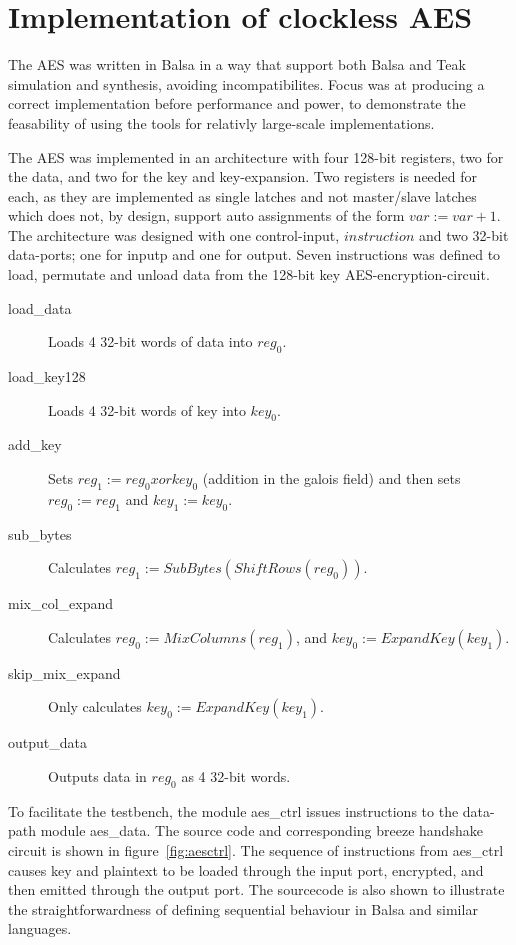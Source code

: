 \section{Implementation of clockless AES}

The AES was written in Balsa in a way that support both Balsa and
Teak simulation and synthesis, avoiding incompatibilites. Focus was at
producing a correct implementation before performance and power, to
demonstrate the feasability of using the tools for relativly
large-scale implementations.

The AES was implemented in an architecture with four 128-bit
registers, two for the data, and two for the key and
key-expansion. Two registers is needed for each, as they are
implemented as single latches and not master/slave latches which does
not, by design, support auto assignments of the form 
$var := var + 1$. The architecture was designed with one control-input,
$instruction$ and two 32-bit data-ports; one for inputp and one for
output. Seven instructions was defined to load, permutate and unload
data from the 128-bit key AES-encryption-circuit.

\begin{description}
  \item[load\_data] Loads 4 32-bit words of data into $reg_0$.
  \item[load\_key128] Loads 4 32-bit words of key into $key_0$.
  \item[add\_key] Sets $reg_1 := reg_0 xor key_0$ (addition in the
    galois field) and then sets $reg_0 := reg_1$ and $key_1 := key_0$.
  \item[sub\_bytes] Calculates $reg_1 := SubBytes(ShiftRows(reg_0))$.
  \item[mix\_col\_expand] Calculates $reg_0 := MixColumns(reg_1)$, and
    $key_0 := ExpandKey(key_1)$.
  \item[skip\_mix\_expand] Only calculates $key_0 := ExpandKey(key_1)$.
  \item[output\_data] Outputs data in $reg_0$ as 4 32-bit words.
\end{description}

To facilitate the testbench, the module aes\_ctrl issues instructions
to the data-path module aes\_data. The source code and corresponding
breeze handshake circuit is shown in figure~\ref{fig:aesctrl}. The
sequence of instructions from aes\_ctrl causes key and plaintext to be
loaded through the input port, encrypted, and then emitted through the
output port. The sourcecode is also shown to illustrate the
straightforwardness of defining sequential behaviour in Balsa and
similar languages.

